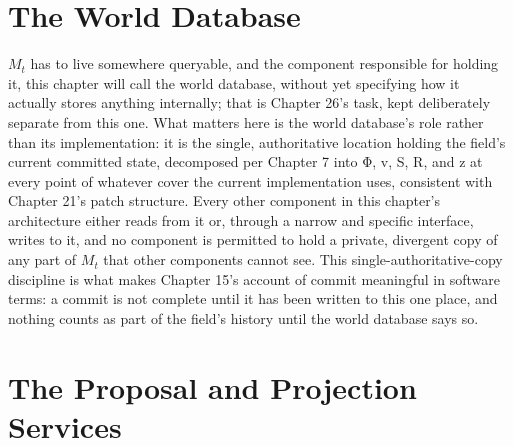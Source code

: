 \section{The World Database}

\(M_t\) has to live somewhere queryable, and the component responsible for holding it, this chapter will call the world database, without yet specifying how it actually stores anything internally; that is Chapter 26's task, kept deliberately separate from this one. What matters here is the world database's role rather than its implementation: it is the single, authoritative location holding the field's current committed state, decomposed per Chapter 7 into Φ, v, S, R, and z at every point of whatever cover the current implementation uses, consistent with Chapter 21's patch structure. Every other component in this chapter's architecture either reads from it or, through a narrow and specific interface, writes to it, and no component is permitted to hold a private, divergent copy of any part of \(M_t\) that other components cannot see. This single-authoritative-copy discipline is what makes Chapter 15's account of commit meaningful in software terms: a commit is not complete until it has been written to this one place, and nothing counts as part of the field's history until the world database says so.

\section{The Proposal and Projection Services}

